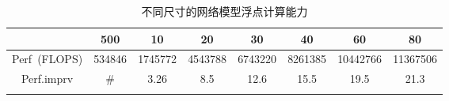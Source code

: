 \begin{center}
\begin{table}
	\caption{不同尺寸的网络模型浮点计算能力}
	\renewcommand\arraystretch{1.2}
	\begin{tabular}{cccccccc}
	\toprule
		 				&		500		&	10		&	20		&	30		&	40		&	60		&	80		\\	\midrule
		Perf~(FLOPS)		&		534846	&	1745772	&	4543788	&	6743220	&	8261385	&	10442766&	11367506	\\	\hline
		Perf.imprv		&		\#		&	3.26	&	8.5		&	12.6	&	15.5	&	19.5	&	21.3	\\
	\bottomrule
	\label{tab:flops}
	\end{tabular}
\end{table}
\vspace{-3em}
\end{center}
